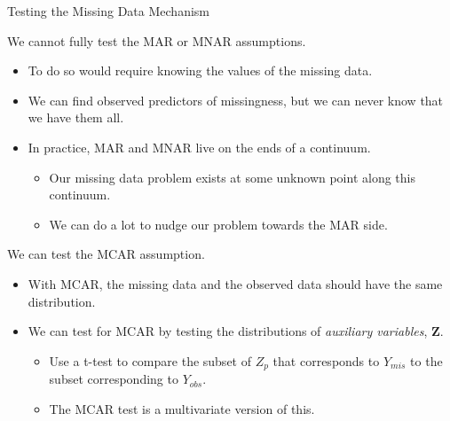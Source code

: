 \documentclass{beamer}\usepackage[]{graphicx}\usepackage[]{color}
\begin{document}
\begin{frame}[allowframebreaks]{Testing the Missing Data Mechanism}
  
  We cannot fully test the MAR or MNAR assumptions.
  \begin{itemize}
  \item To do so would require knowing the values of the missing data.
    \vc
  \item We can find observed predictors of missingness, but we can never know 
    that we have them all.
    \vc
  \item In practice, MAR and MNAR live on the ends of a continuum.
    \begin{itemize}
    \item Our missing data problem exists at some unknown point along this 
      continuum.
      \vc
    \item We can do a lot to nudge our problem towards the MAR side.
    \end{itemize}
  \end{itemize}
   
  \pagebreak
  
  We can test the MCAR assumption.
  \begin{itemize}
  \item With MCAR, the missing data and the observed data should have the same 
    distribution.
    \vc
  \item We can test for MCAR by testing the distributions of \emph{auxiliary 
    variables}, $\mathbf{Z}$.
    \begin{itemize}
    \item Use a t-test to compare the subset of $Z_p$ that corresponds to 
      $Y_{mis}$ to the subset corresponding to $Y_{obs}$.
      \vc
    \item The \citet{little:1988} MCAR test is a multivariate version of this.
    \end{itemize}
  \end{itemize}
  
\end{frame}

\end{document}
